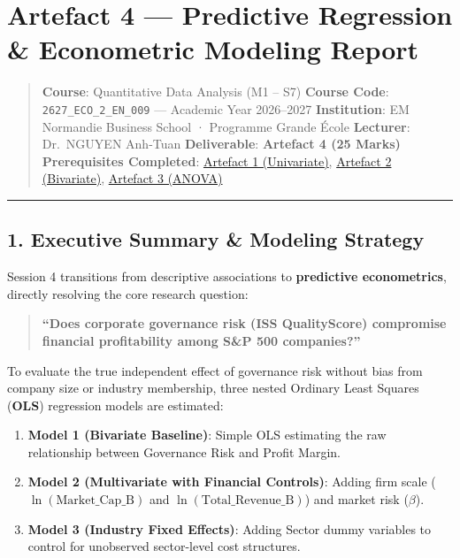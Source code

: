 \documentclass[
]{article}
\author{}
\date{}
\providecommand{\tightlist}{%
  \setlength{\itemsep}{0pt}\setlength{\parskip}{0pt}}
\begin{document}
\section{Artefact 4 --- Predictive Regression \& Econometric Modeling
Report}\label{artefact-4-predictive-regression-econometric-modeling-report}

\begin{quote}
\textbf{Course}: Quantitative Data Analysis (M1 -- S7) \textbf{Course
Code}: \texttt{2627\_ECO\_2\_EN\_009} --- Academic Year 2026--2027
\textbf{Institution}: EM Normandie Business School · Programme Grande
École \textbf{Lecturer}: Dr.~NGUYEN Anh-Tuan \textbf{Deliverable}:
\textbf{Artefact 4 (25 Marks)} \textbf{Prerequisites Completed}:
\href{Artefact_1_Session_1.md}{Artefact 1 (Univariate)},
\href{Artefact_2_Session_2.md}{Artefact 2 (Bivariate)},
\href{Artefact_3_Session_3.md}{Artefact 3 (ANOVA)}
\end{quote}

\begin{center}\rule{0.5\linewidth}{0.5pt}\end{center}

\subsection{1. Executive Summary \& Modeling
Strategy}\label{executive-summary-modeling-strategy}

Session 4 transitions from descriptive associations to
\textbf{predictive econometrics}, directly resolving the core research
question:

\begin{quote}
\textbf{``Does corporate governance risk (ISS QualityScore) compromise
financial profitability among S\&P 500 companies?''}
\end{quote}

To evaluate the true independent effect of governance risk without bias
from company size or industry membership, three nested Ordinary Least
Squares (\textbf{OLS}) regression models are estimated:

\begin{enumerate}
\def\labelenumi{\arabic{enumi}.}
\tightlist
\item
  \textbf{Model 1 (Bivariate Baseline)}: Simple OLS estimating the raw
  relationship between Governance Risk and Profit Margin.
\item
  \textbf{Model 2 (Multivariate with Financial Controls)}: Adding firm
  scale (\(\ln(\text{Market\_Cap\_B})\) and
  \(\ln(\text{Total\_Revenue\_B})\)) and market risk (\(\beta\)).
\item
  \textbf{Model 3 (Industry Fixed Effects)}: Adding Sector dummy
  variables to control for unobserved sector-level cost structures.
\end{enumerate}
\end{document}
